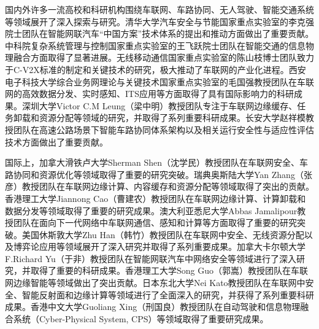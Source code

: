 国内外许多一流高校和科研机构围绕车联网、车路协同、无人驾驶、智能交通系统等领域展开了深入探索与研究。清华大学汽车安全与节能国家重点实验室的李克强院士团队在智能网联汽车“中国方案”技术体系的提出和推动方面做出了重要贡献\cite{wang2023design, li2017dynamical, zheng2016stability}。中科院复杂系统管理与控制国家重点实验室的王飞跃院士团队在智能交通的信息物理融合方面取得了显著进展\cite{li2023sharing, liu2021cyber, lv2021guest}。无线移动通信国家重点实验室的陈山枝博士团队致力于C-V2X标准的制定和关键技术的研究，极大推动了车联网的产业化进程\cite{chen2023cellular, chen2020a, chen2017vehicle}。西安电子科技大学综合业务网理论与关键技术国家重点实验室的毛国强教授团队在车联网的高效数据分发、实时感知、ITS应用等方面取得了具有国际影响力的科研成果\cite{zhang2022new, hao2022dhcloc, yue2022towards}。深圳大学Victor C.M Leung（梁中明）教授团队专注于车联网边缘缓存、任务卸载和资源分配等领域的研究，并取得了系列重要科研成果\cite{sun2023federated, ju2023joint, wang2022efficient}。长安大学赵祥模教授团队在高速公路场景下智能车路协同体系架构以及相关运行安全性与适应性评估技术方面做出了重要贡献\cite{fang2022a, fang2022on, jing2022integrated}。

国际上，加拿大滑铁卢大学Sherman Shen（沈学民）教授团队在车联网安全\cite{chen2022adaptive}、车路协同\cite{liu2022real}和资源优化\cite{li2022cost}等领域取得了重要的研究突破。瑞典奥斯陆大学Yan Zhang（张彦）教授团队在车联网边缘计算\cite{dai2022adaptive}、内容缓存\cite{zhang2022digital}和资源分配\cite{sun2022dynamic}等领域取得了突出的贡献。香港理工大学Jiannong Cao（曹建农）教授团队在车联网边缘计算\cite{yang2022delegating}、计算卸载\cite{dai2023a}和数据分发\cite{yang2020efficient}等领域取得了重要的研究成果。澳大利亚悉尼大学Abbas Jamalipour教授团队在面向下一代网络中车联网通信\cite{qi2022energy}、感知\cite{iranmanesh2022a}和计算\cite{alam2022multi}等方面取得了重要的研究突破。美国休斯敦大学Zhu Han（韩竹）教授团队在车联网中安全\cite{khan2023federated}、无线资源分配\cite{zhang2023mean}以及博弈论应用\cite{kang2021joint}等领域展开了深入研究并取得了系列重要成果。加拿大卡尔顿大学F.Richard Yu（于非）教授团队在智能网联汽车中网络安全\cite{alladi2023ambient, liang2023a, bai2022detection}等领域进行了深入研究，并取得了重要的科研成果。香港理工大学Song Guo（郭嵩）教授团队在车联网边缘智能\cite{wang2922imitation, ren2021blockchain, wang2022design}等领域做出了突出贡献。日本东北大学Nei Kato教授团队在车联网中安全\cite{tang2020future}、智能反射面\cite{zhu2022intelligent}和边缘计算\cite{liu2020smart}等领域进行了全面深入的研究，并获得了系列重要科研成果。香港中文大学Guoliang Xing（刑国良）教授团队在自动驾驶\cite{he2021vi}和信息物理融合系统（Cyber-Physical System, CPS）\cite{shi2022vips}等领域取得了重要研究成果。

